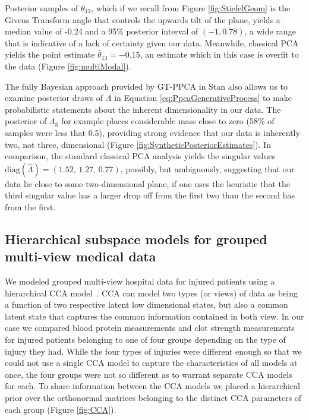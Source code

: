 \documentclass{article}
\begin{document}
Posterior samples of $\theta_{13}$, which if we recall from Figure \ref{fig:StiefelGeom} is the Givens Transform angle that controls the upwards tilt of the plane, yields a median value of -0.24 and a 95\% posterior interval of $(-1, 0.78)$, a wide range that is indicative of a lack of certainty given our data. Meanwhile, classical PCA yields the point estimate $\hat{\theta}_{13} = -0.15$, an estimate which in this case is overfit to the data (Figure \ref{fig:multiModal}). 

The fully Bayesian approach provided by GT-PPCA in Stan also allows us to examine posterior draws of $\Lambda$ in Equation \ref{eq:PpcaGenerativeProcess} to make probabilistic statements about the inherent dimensionality in our data. The posterior of $\Lambda_3$ for example places considerable mass close to zero (58\% of samples were less that 0.5), providing strong evidence that our data is inherently two, not three, dimensional (Figure \ref{fig:SyntheticPosteriorEstimates}). In comparison, the standard classical PCA analysis yields the singular values $\mathrm{diag}(\hat{\Lambda}) = (1.52,\, 1.27,\, 0.77)$, possibly, but ambiguously, suggesting that our data lie close to some two-dimensional plane, if one uses the heuristic that the third singular value has a larger drop off from the first two than the second has from the first.

\subsection{Hierarchical subspace models for grouped multi-view medical data}
We modeled grouped multi-view hospital data for injured patients using a hierarchical CCA model~\citep[chapt.~15.2]{murphy2012machine}. CCA can model two types (or views) of data as being a function of two respective latent low dimensional states, but also a common latent state that captures the common information contained in both view. In our case we compared blood protein measurements and clot strength measurements for injured patients belonging to one of four groups depending on the type of injury they had. While the four types of injuries were different enough so that we could not use a single CCA model to capture the characteristics of all models at once, the four groups were not so different as to warrant separate CCA models for each. To share information between the CCA models we placed a hierarchical prior over the orthonormal matrices belonging to the distinct CCA parameters of each group (Figure \ref{fig:CCA}).
\end{document}
